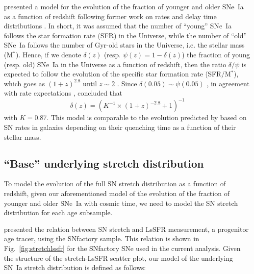 \documentclass[]{aa} %
\begin{document}
\cite{rigault2018} presented a model for the evolution of the fraction of
younger and older SNe~Ia as a function of redshift following former work on
rates and delay time distributions \citep[e.g.,][]{mannucci2005,
scannapieco2005, sullivan2006, aubourg2008, childress2014, maozmannucci2014}.
In short, it was assumed that the number of ``young'' SNe~Ia follows the star
formation rate (SFR) in the Universe, while the number of ``old'' SNe~Ia
follows the number of Gyr-old stars in the Universe, i.e. the stellar mass
(M$^*$). Hence, if we denote $\delta(z)$ (resp. $\psi(z) = 1-\delta(z)$) the
fraction of young (resp. old) SNe~Ia in the Universe as a function of redshift,
then the ratio $\delta/\psi$ is expected to follow the evolution of the specific
star formation rate (SFR/M$^*$), which goes as $(1+z)^{2.8}$ until $z\sim2$
\citep[e.g.,][]{tasca2015}. Since $\delta(0.05) \sim \psi(0.05)$
\citep{rigault2013,rigault2018,wiseman2020}, in agreement with rate expectations
\citep{mannucci2006,rodney2014}, \cite{rigault2018} concluded that
\begin{equation}
    \label{eq:delta}
    \delta(z) = \left( K^{-1} \times (1+z)^{-2.8} +1 \right)^{-1}
\end{equation}
with $K=0.87$. This model is comparable to the evolution predicted by
\cite{childress2014} based on SN rates in galaxies depending on their quenching
time as a function of their stellar mass.

\subsection{``Base'' underlying stretch distribution}
\label{sec:basemodel}

To model the evolution of the full SN stretch distribution as a function of
redshift, given our aforementioned model of the evolution of the fraction of
younger and older SNe~Ia with cosmic time, we need to model the SN stretch
distribution for each age subsample. 

\cite{rigault2018} presented the relation between SN stretch and LsSFR
measurement, a progenitor age tracer, using the SNfactory sample. This relation
is shown in Fig.~\ref{fig:stretchlssfr} for the SNfactory SNe used in the
current analysis. Given the structure of the stretch-LsSFR scatter plot, our
model of the underlying SN~Ia stretch distribution is defined as follows:
\end{document}
